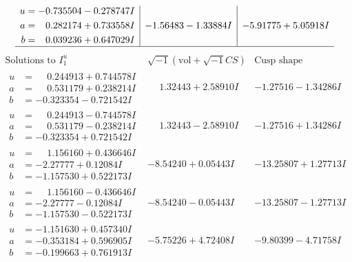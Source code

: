 \documentclass[1p]{elsarticle_modified}
\theoremstyle{definition}
\newcommand{\I}{\sqrt{-1}}
\begin{document}
$$\begin{array}{c|c|c}
\begin{aligned}
u &= -0.735504 - 0.278747 I \\
a &= \phantom{-}0.282174 + 0.733558 I \\
b &= \phantom{-}0.039236 + 0.647029 I\end{aligned}
 & -1.56483 - 1.33884 I & -5.91775 + 5.05918 I\\
 \hline 
 \end{array}$$\newpage$$\begin{array}{c|c|c}  
\text{Solutions to }I^u_{1}& \I (\text{vol} + \sqrt{-1}CS) & \text{Cusp shape}\\
 \hline 
\begin{aligned}
u &= \phantom{-}0.244913 + 0.744578 I \\
a &= \phantom{-}0.531179 + 0.238214 I \\
b &= -0.323354 - 0.721542 I\end{aligned}
 & \phantom{-}1.32443 + 2.58910 I & -1.27516 - 1.34286 I \\ \hline\begin{aligned}
u &= \phantom{-}0.244913 - 0.744578 I \\
a &= \phantom{-}0.531179 - 0.238214 I \\
b &= -0.323354 + 0.721542 I\end{aligned}
 & \phantom{-}1.32443 - 2.58910 I & -1.27516 + 1.34286 I \\ \hline\begin{aligned}
u &= \phantom{-}1.156160 + 0.436646 I \\
a &= -2.27777 + 0.12084 I \\
b &= -1.157530 + 0.522173 I\end{aligned}
 & -8.54240 + 0.05443 I & -13.25807 + 1.27713 I \\ \hline\begin{aligned}
u &= \phantom{-}1.156160 - 0.436646 I \\
a &= -2.27777 - 0.12084 I \\
b &= -1.157530 - 0.522173 I\end{aligned}
 & -8.54240 - 0.05443 I & -13.25807 - 1.27713 I \\ \hline\begin{aligned}
u &= -1.151630 + 0.457340 I \\
a &= -0.353184 + 0.596905 I \\
b &= -0.199663 + 0.761913 I\end{aligned}
 & -5.75226 + 4.72408 I & -9.80399 - 4.71758 I \\ \hline\begin{aligned}

\end{aligned}
\end{array}$$
\end{document}
